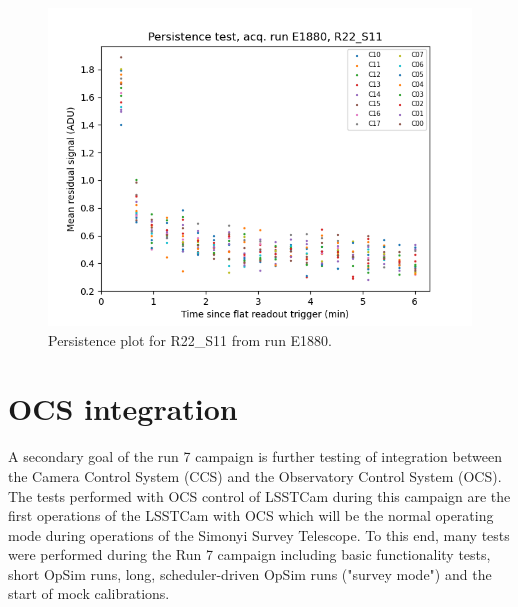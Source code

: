 \begin{figure}
    \centering
    \includegraphics[width=0.8\linewidth]{figures/ReferenceFigures/persistence_plot_LSSTCam_R22_S11_u_lsstccs_eo_persistence_E1880_w_2024_35_20241101T020526Z.png}
    \caption{Persistence plot for R22\_S11 from run E1880.}
    \label{fig:ref:persistence}
\end{figure}

\clearpage
\section{OCS integration}
A secondary goal of the run 7 campaign is further testing of integration between the Camera Control System (CCS) and the Observatory Control System (OCS). The tests performed with OCS control of LSSTCam during this campaign are the first operations of the LSSTCam with OCS which will be the normal operating mode during operations of the Simonyi Survey Telescope. To this end, many tests were performed during the Run 7 campaign including basic functionality tests, short OpSim runs, long, scheduler-driven OpSim runs ("survey mode") and the start of mock calibrations.


